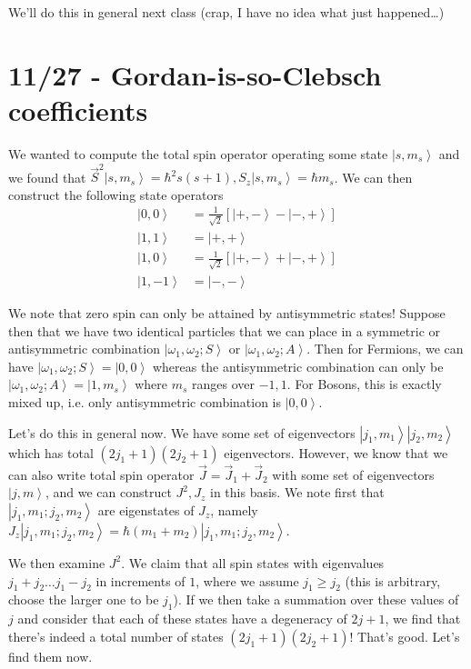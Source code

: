 \documentclass[10pt]{report}
\newcommand{\ket}[1]{\left|#1\right>}
\begin{document}
We'll do this in general next class (crap, I have no idea what just happened\dots)

\chapter{11/27 - Gordan-is-so-Clebsch coefficients}

We wanted to compute the total spin operator operating some state $\ket{s, m_s}$ and we found that $\vec{S}^2\ket{s,m_s} = \hbar^2 s(s+1), S_z \ket{s,m_s} = \hbar m_s$. We can then construct the following state operators
\begin{align*}
    \ket{0,0} &= \frac{1}{\sqrt{2}} \left[ \ket{+,-} - \ket{-,+} \right]\\
    \ket{1,1} &= \ket{+,+}\\
    \ket{1,0} &= \frac{1}{\sqrt{2}}\left[ \ket{+,-} + \ket{-,+} \right]\\
    \ket{1,-1} &= \ket{-,-}
\end{align*}

We note that zero spin can only be attained by antisymmetric states! Suppose then that we have two identical particles that we can place in a symmetric or antisymmetric combination $\ket{\omega_1, \omega_2; S}$ or $\ket{\omega_1, \omega_2; A}$. Then for Fermions, we can have $\ket{\omega_1, \omega_2; S} = \ket{0,0}$ whereas the antisymmetric combination can only be $\ket{\omega_1, \omega_2; A} = \ket{1,m_s}$ where $m_s$ ranges over $-1,1$. For Bosons, this is exactly mixed up, i.e. only antisymmetric combination is $\ket{0,0}$.

Let's do this in general now. We have some set of eigenvectors $\ket{j_1, m_1} \ket{j_2, m_2}$ which has total $(2j_1+1)(2j_2+1)$ eigenvectors. However, we know that we can also write total spin operator $\vec{J} = \vec{J}_1 + \vec{J}_2$ with some set of eigenvectors $\ket{j,m}$, and we can construct $J^2, J_z$ in this basis. We note first that $\ket{j_1, m_1; j_2, m_2}$ are eigenstates of $J_z$, namely $J_z\ket{j_1, m_1; j_2, m_2} = \hbar(m_1 + m_2) \ket{j_1, m_1; j_2, m_2}$.

We then examine $J^2$. We claim that all spin states with eigenvalues $j_1 + j_2\dots j_1 - j_2$ in increments of $1$, where we assume $j_1 \geq j_2$ (this is arbitrary, choose the larger one to be $j_1$). If we then take a summation over these values of $j$ and consider that each of these states have a degeneracy of $2j+1$, we find that there's indeed a total number of states $(2j_1+1)(2j_2+1)$! That's good. Let's find them now.
\end{document}
